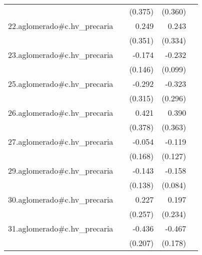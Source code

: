 {\begin{longtable}{l*{4}{D{.}{.}{-1}}}
            &                     &     (0.375)         &     (0.360)         &                     \\
\addlinespace
22.aglomerado#c.hv\_precaria&                     &       0.249         &       0.243         &                     \\
            &                     &     (0.351)         &     (0.334)         &                     \\
\addlinespace
23.aglomerado#c.hv\_precaria&                     &      -0.174         &      -0.232\sym{*}  &                     \\
            &                     &     (0.146)         &     (0.099)         &                     \\
\addlinespace
25.aglomerado#c.hv\_precaria&                     &      -0.292         &      -0.323         &                     \\
            &                     &     (0.315)         &     (0.296)         &                     \\
\addlinespace
26.aglomerado#c.hv\_precaria&                     &       0.421         &       0.390         &                     \\
            &                     &     (0.378)         &     (0.363)         &                     \\
\addlinespace
27.aglomerado#c.hv\_precaria&                     &      -0.054         &      -0.119         &                     \\
            &                     &     (0.168)         &     (0.127)         &                     \\
\addlinespace
29.aglomerado#c.hv\_precaria&                     &      -0.143         &      -0.158         &                     \\
            &                     &     (0.138)         &     (0.084)         &                     \\
\addlinespace
30.aglomerado#c.hv\_precaria&                     &       0.227         &       0.197         &                     \\
            &                     &     (0.257)         &     (0.234)         &                     \\
\addlinespace
31.aglomerado#c.hv\_precaria&                     &      -0.436\sym{*}  &      -0.467\sym{**} &                     \\
            &                     &     (0.207)         &     (0.178)         &                     \\

\end{longtable}}
